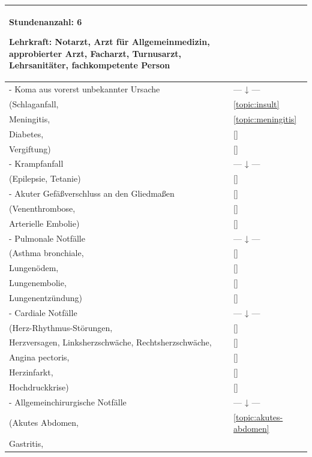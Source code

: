 \begin{xtabular}{p{10cm}p{5cm}}
\begin{inparadesc}
\item[Stundenanzahl:]  6
\item[Lehrkraft:]  Notarzt, Arzt für Allgemeinmedizin, approbierter Arzt,
Facharzt, Turnusarzt, Lehrsanitäter, fachkompetente Person
\end{inparadesc}
\\\midrule
- Koma aus vorerst unbekannter Ursache      
& 
--- ↓ --- 
\\
(Schlaganfall,           
& 
\ref{topic:insult}
\\
Meningitis, 
& 
\ref{topic:meningitis}
\\
Diabetes,   
& 
\ref{}\noindent{}
\\
Vergiftung)             
& 
\ref{}\noindent{}
\\
- Krampfanfall             
& 
--- ↓ --- 
\\
(Epilepsie, Tetanie)    
& 
\ref{}\noindent{}
\\
- Akuter Gefäßverschluss an den Gliedmaßen     
& 
\ref{}\noindent{}
\\
(Venenthrombose,       
& 
\ref{}\noindent{}
\\
Arterielle Embolie)     
& 
\ref{}\noindent{}
\\
- Pulmonale Notfälle      
& 
--- ↓ ---
\\
(Asthma bronchiale,
& 
\ref{}\noindent{}
\\
Lungenödem, 
& 
\ref{}\noindent{}
\\
Lungenembolie, 
& 
\ref{}\noindent{}
\\
Lungenentzündung)
& 
\ref{}\noindent{}
\\
- Cardiale Notfälle 
& 
--- ↓ --- 
\\
(Herz-Rhythmus-Störungen, 
& 
\ref{}\noindent{}
\\
Herzversagen, Linksherzschwäche,
Rechtsherzschwäche, 
& 
\ref{}\noindent{}
\\
Angina pectoris, 
& 
\ref{}\noindent{}
\\
Herzinfarkt, 
& 
\ref{}\noindent{}
\\
Hochdruckkrise) 
& 
\ref{}\noindent{}
\\
- Allgemeinchirurgische Notfälle & --- ↓ --- 
\\
(Akutes Abdomen, & \ref{topic:akutes-abdomen}
\\
Gastritis, & \noindent{}
\\

\end{xtabular}
